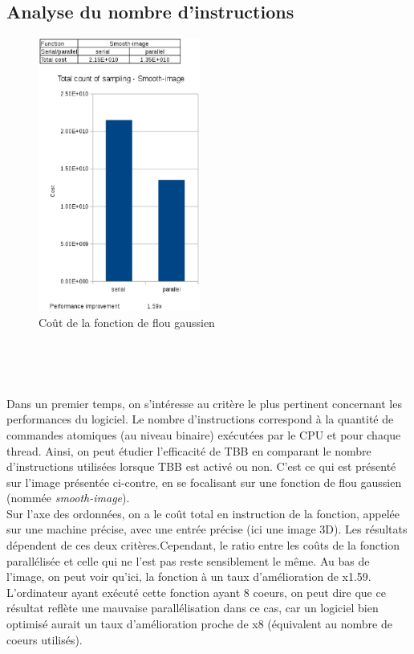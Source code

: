 \documentclass[10pt]{report}
\begin{document}
	

	
	\subsection{Analyse du nombre d'instructions}
	
	\begin{figure}
		\includegraphics[height=9cm]{Reports/figures/smooth_image_costs.eps}
		\caption{Coût de la fonction de flou gaussien}
		\label{Coût de la fonction de flou gaussien}
	\end{figure}
	~\par~\par
	Dans un premier temps, on s'intéresse au critère le plus pertinent concernant les performances du logiciel. Le nombre d'instructions correspond à la quantité de commandes atomiques (au niveau binaire) exécutées par le CPU et pour chaque thread.
	Ainsi, on peut étudier l'efficacité de TBB en comparant le nombre d'instructions utilisées lorsque TBB est activé ou non. C'est ce qui est présenté sur l'image présentée ci-contre, en se focalisant sur une fonction de flou gaussien (nommée \textit{smooth-image}).\\
	Sur l'axe des ordonnées, on a le coût total en instruction de la fonction, appelée sur une machine précise, avec une entrée précise (ici une image 3D). Les résultats dépendent de ces deux critères.Cependant, le ratio entre les coûts de la fonction parallélisée et celle qui ne l'est pas reste sensiblement le même. Au bas de l'image, on peut voir qu'ici, la fonction à un taux d'amélioration de x1.59. L'ordinateur ayant exécuté cette fonction ayant 8 coeurs, on peut dire que ce résultat reflète une mauvaise parallélisation dans ce cas, car un logiciel bien optimisé aurait un taux d'amélioration proche de x8 (équivalent au nombre de coeurs utilisés).\\
\end{document}
